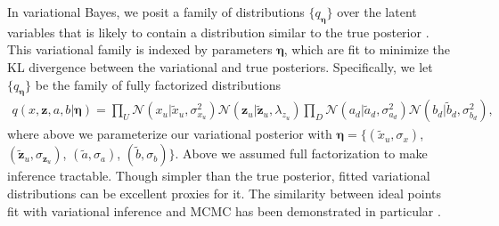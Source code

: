 In variational Bayes, we posit a family of distributions $\{ q_{\bm
  \eta} \}$ over the latent variables that is likely to contain a
distribution similar to the true posterior \cite{jordan:1999}.  This
variational family is indexed by parameters $\bm \eta$, which are fit
to minimize the KL divergence between the variational and true
posteriors.
Specifically, we let $\{ q_{\bm \eta} \}$ be the family of fully factorized distributions
\begin{align}
  \label{equation:variational_posterior}
q(x, \bm z, a, b | \bm \eta ) = 
  \prod_U \mathcal{N}(x_u | \tilde x_u, \sigma_{x_u}^2 )
  \mathcal{N}(\bm z_u | \bm \tilde z_u, \lambda_{z_u} )
  \prod_D \mathcal{N}(a_d | \tilde a_d, \sigma_{a_d}^2)
  \mathcal{N}(b_d | \tilde b_d, \sigma_{b_d}^2),
\end{align}
where above we parameterize our variational posterior with $\bm \eta =
\{ (\tilde x_u, \sigma_{x})$, $(\bm \tilde z_u, \sigma_{\bm z_u})$,
$(\tilde a, \sigma_{a})$, $(\tilde
b, \sigma_{b}) \}$.  Above we assumed full factorization to make
inference tractable.
Though simpler than the true posterior, fitted variational
distributions can be excellent proxies for it. The similarity between
ideal points fit with variational inference and MCMC has been
demonstrated in particular \cite{gerrish:2011}.

